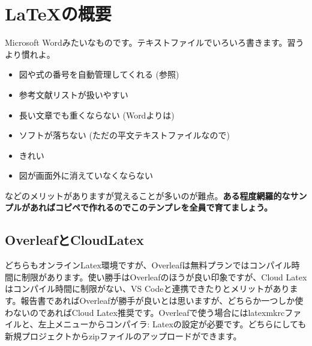 \documentclass[uplatex,dvipdfmx,a4j,9pt,twocolumn,twoside]{jsarticle}
\begin{document}


\section{\LaTeX の概要}

Microsoft Wordみたいなものです。テキストファイルでいろいろ書きます。習うより慣れよ。
\begin{itemize}
    \item 図や式の番号を自動管理してくれる (参照)
    \item 参考文献リストが扱いやすい
    \item 長い文章でも重くならない (Wordよりは)
    \item ソフトが落ちない (ただの平文テキストファイルなので)
    \item きれい
    \item 図が画面外に消えていなくならない
\end{itemize}
などのメリットがありますが覚えることが多いのが難点。\textbf{ある程度網羅的なサンプルがあればコピペで作れるのでこのテンプレを全員で育てましょう。}

\subsection{OverleafとCloudLatex}

どちらもオンラインLatex環境ですが、Overleafは無料プランではコンパイル時間に制限があります。使い勝手はOverleafのほうが良い印象ですが、Cloud Latexはコンパイル時間に制限がない、VS Codeと連携できたりとメリットがあります。報告書であればOverleafが勝手が良いとは思いますが、どちらか一つしか使わないのであればCloud Latex推奨です。Overleafで使う場合にはlatexmkrcファイルと、左上メニューからコンパイラ: Latexの設定が必要です。どちらにしても新規プロジェクトからzipファイルのアップロードができます。
\end{document}
